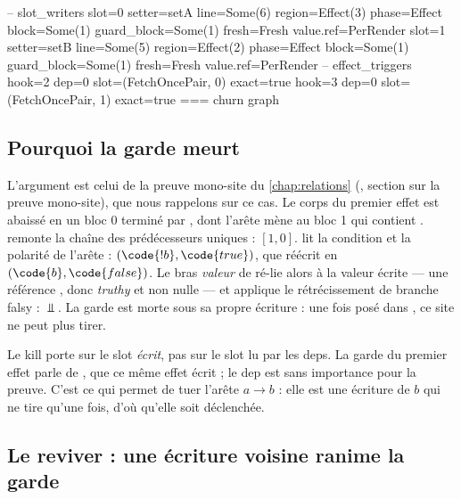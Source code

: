 \begin{sortie}
-- slot_writers
  slot=0 setter=setA line=Some(6) region=Effect(3) phase=Effect block=Some(1) guard_block=Some(1) fresh=Fresh value.ref=PerRender
  slot=1 setter=setB line=Some(5) region=Effect(2) phase=Effect block=Some(1) guard_block=Some(1) fresh=Fresh value.ref=PerRender
-- effect_triggers
  hook=2 dep=0 slot=(FetchOncePair, 0) exact=true
  hook=3 dep=0 slot=(FetchOncePair, 1) exact=true
=== churn graph
\end{sortie}

\subsection{Pourquoi la garde meurt}

L'argument est celui de la preuve mono-site du \cref{chap:relations}
(, section sur la preuve mono-site), que nous rappelons
sur ce cas. Le corps du premier effet est abaissé en un bloc 0 terminé par
, dont l'arête  mène au bloc 1 qui contient
.  remonte la chaîne des prédécesseurs uniques :
$[1, 0]$.  lit la condition et la polarité de l'arête : $(\code{!b},
\code{true})$, que  réécrit en $(\code{b}, \code{false})$. Le bras
\emph{valeur} de  ré-lie alors  à la valeur écrite --- une
référence , donc \emph{truthy} et non nulle --- et applique le
rétrécissement de branche \og {} falsy\fg{} : $\Bot$. La garde est morte sous sa
propre écriture : une fois  posé dans , ce site ne peut plus tirer.

\begin{remarque}
Le kill porte sur le slot \emph{écrit}, pas sur le slot lu par les deps. La garde
 du premier effet parle de , que ce même effet écrit ; le dep 
est sans importance pour la preuve. C'est ce qui permet de tuer l'arête $a \to b$ : elle
est \og une écriture de $b$ qui ne tire qu'une fois\fg, d'où qu'elle soit déclenchée.
\end{remarque}

\subsection{Le reviver : une écriture voisine ranime la garde}

